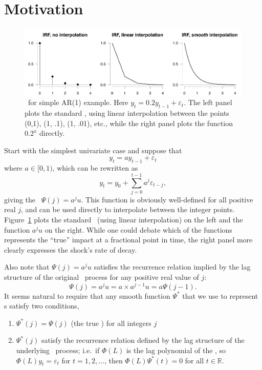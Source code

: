 \documentclass[12pt,fleqn]{article}
\newcommand{\vep}{\varepsilon}
\newcommand{\AR}{\allcaps{AR}}
\newcommand{\RR}{\mathbb{R}}
\begin{document}
\section{Motivation}

\begin{figure}[t]
  \centering
  \includegraphics{graphs/motivation.pdf}
  \caption{\IRF\ for simple AR(1) example. Here $y_t = 0.2 y_{t-1} +
    \vep_t$. The left panel plots the standard \IRF, using linear
    interpolation between the points (0,1), (1, .1), (1, .01), etc.,
    while the right panel plots the function $0.2^x$ directly.}
  \label{f0}
\end{figure}

Start with the simplest univariate case and suppose that
\begin{equation}\label{eq:2}
y_t = a y_{t-1} + \vep_t
\end{equation}
where $a \in [0, 1)$, which can be rewritten as
\begin{equation}
  \label{eq:3}
  y_t = y_0 + \sum_{j=0}^{t-1} a^j \vep_{t-j},
\end{equation}
giving the \IRF\ $\Psi(j) = a^j u$. This function is obviously
well-defined for all positive real $j$, and can be used directly to
interpolate between the integer points. Figure~\ref{f0} plots the
standard \IRF\ (using linear interpolation) on the left and the
function $a^j u$ on the right. While one could debate which of the
functions represents the ``true'' impact at a fractional point in
time, the right panel more clearly expresses the shock's rate of
decay.

Also note that $\Psi(j) = a^j u$ satisfies the recurrence relation
implied by the lag structure of the original \AR\ process for any
positive real value of $j$:
\begin{equation*}
  \Psi(j) = a^j u = a \times a^{j-1} u = a \Psi(j-1).
\end{equation*}
It seems natural to require that any smooth function $\Psi^*$ that we
use to represent \IRF s satisfy two conditions,
\begin{enumerate}
\item $\Psi^*(j) = \Psi(j)$ (the true \IRF) for all integers $j$
\item $\Psi^*(j)$ satisfy the recurrence relation defined by the lag
  structure of the underlying \VAR\ process; i.e.\ if $\Phi(L)$ is the
  lag polynomial of the \VAR, so $\Phi(L)y_t = \vep_t$ for $t = 1, 2,
  \dots$, then $\Phi(L) \Psi^*(t) = 0$ for all $t \in \RR$.
\end{enumerate}
\end{document}

